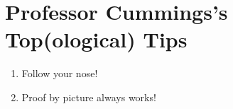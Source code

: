 \section{Professor Cummings's Top(ological) Tips}

\begin{enumerate}
    \item Follow your nose!
    \item Proof by picture always works!
\end{enumerate}